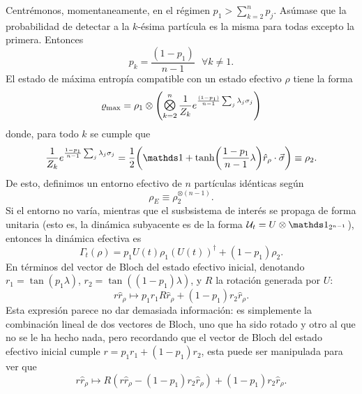 Centrémonos, momentaneamente, en el régimen $p_{1}>\sum_{k=2}^{n}p_{j}$. Asúmase que la probabilidad de detectar a la $k$-ésima partícula es la misma para todas excepto la primera. Entonces
\begin{equation*}
    p_{k}=\frac{(1-p_{1})}{n-1}\text{ }\forall k\neq 1.
\end{equation*}
El estado de máxima entropía compatible con un estado efectivo $\rho$ tiene la forma
\begin{equation*}
    \varrho_{\max}=\rho_{1}\otimes\qty(\Motimes_{k=2}^{n}\frac{1}{Z_{k}}e^{\frac{(1-p_{1})}{n-1}\sum_{j}\lambda_{j}\pauli{j}})
\end{equation*}
donde, para todo $k$ se cumple que
\begin{equation*}
    \frac{1}{Z_{k}}e^{\frac{1-p_{1}}{n-1}\sum_{j}\lambda_{j}\pauli{j}}=\frac{1}{2}\qty(\Id+\tanh(\frac{1-p_{1}}{n-1}\lambda)\hat{r}_{\rho}\cdot\vec{\sigma})\equiv \rho_{2}.
\end{equation*}
De esto, definimos un entorno efectivo de $n$ partículas idénticas según
\begin{equation*}
    \rho_{E}\equiv\rho_{2}^{\otimes(n-1)}.
\end{equation*}
Si el entorno no varía, mientras que el susbsistema de interés se propaga de forma unitaria (esto es, la dinámica subyacente es de la forma $\mcU_{t}=U\otimes\Id_{2^{n-1}}$), entonces la dinámica efectiva es
\begin{equation*}
    \Gamma_{t}(\rho)=p_{1}U(t)\rho_{1}(U(t))^{\dag}+(1-p_{1})\rho_{2}.
\end{equation*}
En términos del vector de Bloch del estado efectivo inicial, denotando $r_{1}=\tan(p_{1}\lambda)$, $r_{2}=\tan((1-p_{1})\lambda)$, y $R$ la rotación generada por $U$:
\begin{equation*}
    r\hat{r}_{\rho}\mapsto p_{1}r_{1}R\hat{r}_{\rho}+(1-p_{1})r_{2}\hat{r}_{\rho}.
\end{equation*}
Esta expresión parece no dar demasiada información: es simplemente la combinación lineal de dos vectores de Bloch, uno que ha sido rotado y otro al que no se le ha hecho nada, pero recordando que el vector de Bloch del estado efectivo inicial cumple $r=p_{1}r_{1}+(1-p_{1})r_{2}$, esta puede ser manipulada para ver que
\begin{equation*}
    r\hat{r}_{\rho}\mapsto R(r\hat{r}_{\rho}-(1-p_{1})r_{2}\hat{r}_{\rho})+(1-p_{1})r_{2}\hat{r}_{\rho}.
\end{equation*}
